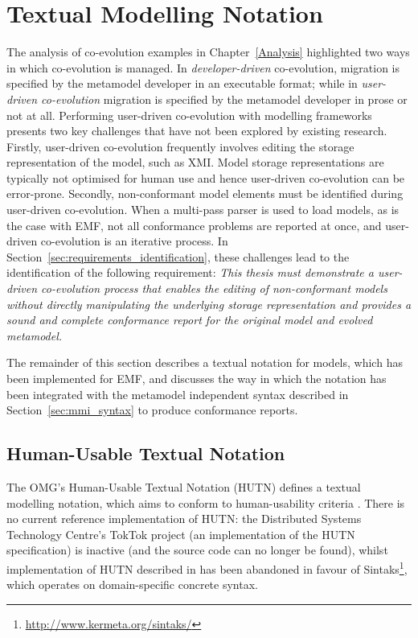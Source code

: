 
\section{Textual Modelling Notation}
\label{sec:notation}
The analysis of co-evolution examples in Chapter~\ref{Analysis} highlighted two ways in which co-evolution is managed. In \emph{developer-driven} co-evolution, migration is specified by the metamodel developer in an executable format; while in \emph{user-driven co-evolution} migration is specified by the metamodel developer in prose or not at all. Performing user-driven co-evolution with modelling frameworks presents two key challenges that have not been explored by existing research. Firstly, user-driven co-evolution frequently involves editing the storage representation of the model, such as XMI. Model storage representations are typically not optimised for human use and hence user-driven co-evolution can be error-prone. Secondly, non-conformant model elements must be identified during user-driven co-evolution. When a multi-pass parser is used to load models, as is the case with EMF, not all conformance problems are reported at once, and user-driven co-evolution is an iterative process. In Section~\ref{sec:requirements_identification}, these challenges lead to the identification of the following requirement: \emph{This thesis must demonstrate a user-driven co-evolution process that enables the editing of non-conformant models without directly manipulating the underlying storage representation and provides a sound and complete conformance report for the original model and evolved metamodel.}

The remainder of this section describes a textual notation for models, which has been implemented for EMF, and discusses the way in which the notation has been integrated with the metamodel independent syntax described in Section~\ref{sec:mmi_syntax} to produce conformance reports. 


\subsection{Human-Usable Textual Notation}
\label{subsec:hutn}
The OMG's Human-Usable Textual Notation (HUTN) \cite{hutn} defines a textual modelling notation, which aims to conform to human-usability criteria \cite{hutn}. There is no current reference implementation of HUTN: the Distributed Systems Technology Centre's TokTok project (an implementation of the HUTN specification) is inactive (and the source code can no longer be found), whilst implementation of HUTN described in \cite{muller05hutn} has been abandoned in favour of Sintaks\footnote{\url{http://www.kermeta.org/sintaks/}}, which operates on domain-specific concrete syntax.

